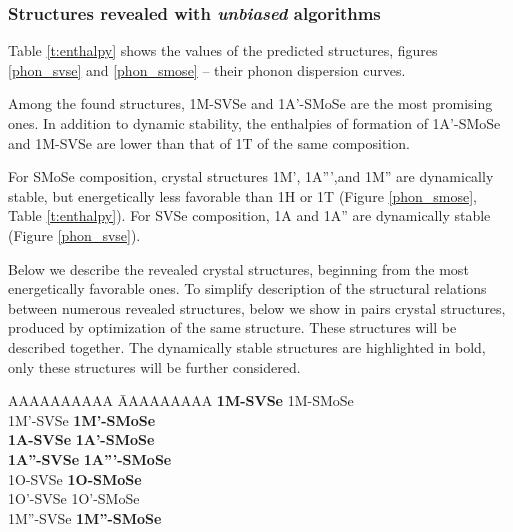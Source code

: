 \documentclass[a4paperm]{article}
\begin{document}
\subsubsection{Structures revealed with {\it unbiased} algorithms}
Table \ref{t:enthalpy} shows the values of the predicted structures, figures \ref{phon_svse} and  \ref{phon_smose} -- their phonon dispersion curves. 

Among the found structures, 1M-SVSe and 1A'-SMoSe are the most promising ones.
In addition to dynamic stability, the enthalpies of formation of 1A'-SMoSe and 1M-SVSe are lower than that of 1T of the same composition. 

For SMoSe composition, crystal structures 1M', 1A''',and 1M'' are dynamically stable, but energetically less favorable than 1H or 1T (Figure \ref{phon_smose}, Table \ref{t:enthalpy}).
For SVSe composition, 1A and 1A'' are dynamically stable (Figure \ref{phon_svse}). 

Below we describe the revealed crystal structures, beginning from the most energetically favorable ones.
To simplify description of the structural relations between numerous revealed structures, below we show in pairs crystal structures, produced by optimization of the same structure.
These structures will be described together.
The dynamically stable structures are highlighted in bold, only these structures will be further considered.

\begin{tabbing} \centering
	AAAAAAAAAA \= AAAAAAAAA \kill
	{\bf 1M-SVSe} \> 1M-SMoSe \\
	1M'-SVSe \> {\bf 1M'-SMoSe} \\
	{\bf 1A-SVSe} \> {\bf 1A'-SMoSe} \\
	{\bf 1A''-SVSe} \> {\bf 1A'''-SMoSe} \\
	
	1O-SVSe \> {\bf 1O-SMoSe} \\
	1O'-SVSe \> 1O'-SMoSe \\
	1M''-SVSe \> {\bf 1M''-SMoSe}
\end{tabbing}
\end{document}
